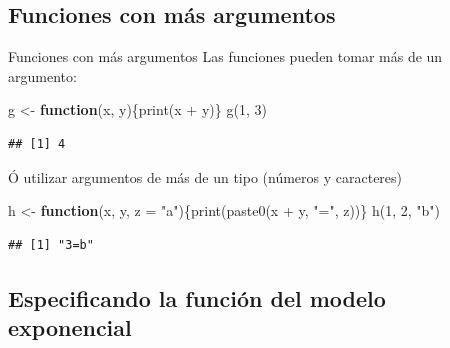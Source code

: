 \documentclass[
  11pt,
  ignorenonframetext,
]{beamer}
\newenvironment{Shaded}{}{}
\newcommand{\AttributeTok}[1]{\textcolor[rgb]{0.49,0.56,0.16}{#1}}
\newcommand{\ControlFlowTok}[1]{\textcolor[rgb]{0.00,0.44,0.13}{\textbf{#1}}}
\newcommand{\DecValTok}[1]{\textcolor[rgb]{0.25,0.63,0.44}{#1}}
\newcommand{\FunctionTok}[1]{\textcolor[rgb]{0.02,0.16,0.49}{#1}}
\newcommand{\NormalTok}[1]{#1}
\newcommand{\OtherTok}[1]{\textcolor[rgb]{0.00,0.44,0.13}{#1}}
\newcommand{\SpecialCharTok}[1]{\textcolor[rgb]{0.25,0.44,0.63}{#1}}
\newcommand{\StringTok}[1]{\textcolor[rgb]{0.25,0.44,0.63}{#1}}
\begin{document}
\hypertarget{funciones-con-muxe1s-argumentos}{%
\subsection{Funciones con más
argumentos}\label{funciones-con-muxe1s-argumentos}}

\begin{frame}[fragile]{Funciones con más argumentos}
Las funciones pueden tomar más de un argumento:

\begin{Shaded}
\begin{Highlighting}[]
\NormalTok{g }\OtherTok{\textless{}{-}} \ControlFlowTok{function}\NormalTok{(x, y)\{}\FunctionTok{print}\NormalTok{(x }\SpecialCharTok{+}\NormalTok{ y)\}}
\FunctionTok{g}\NormalTok{(}\DecValTok{1}\NormalTok{, }\DecValTok{3}\NormalTok{)}
\end{Highlighting}
\end{Shaded}

\begin{verbatim}
## [1] 4
\end{verbatim}

Ó utilizar argumentos de más de un tipo (números y caracteres)

\begin{Shaded}
\begin{Highlighting}[]
\NormalTok{h }\OtherTok{\textless{}{-}} \ControlFlowTok{function}\NormalTok{(x, y, }\AttributeTok{z =} \StringTok{"a"}\NormalTok{)\{}\FunctionTok{print}\NormalTok{(}\FunctionTok{paste0}\NormalTok{(x }\SpecialCharTok{+}\NormalTok{ y, }\StringTok{"="}\NormalTok{, z))\}}
\FunctionTok{h}\NormalTok{(}\DecValTok{1}\NormalTok{, }\DecValTok{2}\NormalTok{, }\StringTok{"b"}\NormalTok{)}
\end{Highlighting}
\end{Shaded}

\begin{verbatim}
## [1] "3=b"
\end{verbatim}
\end{frame}

\hypertarget{especificando-la-funciuxf3n-del-modelo-exponencial}{%
\subsection{Especificando la función del modelo
exponencial}\label{especificando-la-funciuxf3n-del-modelo-exponencial}}
\end{document}
